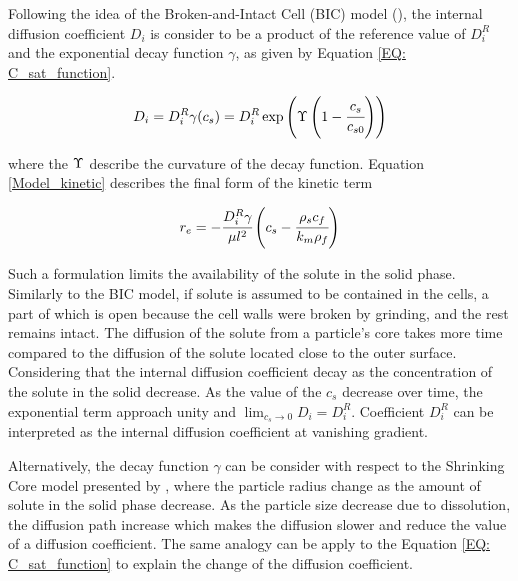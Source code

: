 \documentclass[../Article_Model_Parameters.tex]{subfiles}
\begin{document}
	Following the idea of the Broken-and-Intact Cell (BIC) model (\citet{Sovova2017}), the internal diffusion coefficient $D_i$ is consider to be a product of the reference value of $D_i^R$ and the exponential decay function $\gamma$, as given by Equation \ref{EQ: C_sat_function}.
		
	{\footnotesize
		\begin{equation}
			D_i = D_i^R \gamma(c_s) = D_i^R \exp \left( \Upsilon \left( 1-\cfrac{ c_s }{c_{s0}} \right) \right) \label{EQ: C_sat_function}
		\end{equation} }
	
	where the ${\color{black}\Upsilon}$ describe the curvature of the decay function. Equation \ref{Model_kinetic} describes the final form of the kinetic term
			
	{\footnotesize
		\begin{equation}
			\label{Model_kinetic}
				r_e = -\cfrac{D_i^R \gamma }{ \mu l^2 } \left( c_s  - \cfrac{\rho_s c_f }{ k_m \rho_f }  \right)
		\end{equation} }
	
	Such a formulation limits the availability of the solute in the solid phase. Similarly to the BIC model, if solute is assumed to be contained in the cells, a part of which is open because the cell walls were broken by grinding, and the rest remains intact. The diffusion of the solute from a particle's core takes more time compared to the diffusion of the solute located close to the outer surface. Considering that the internal diffusion coefficient decay as the concentration of the solute in the solid decrease. As the value of the $c_s$ decrease over time, the exponential term approach unity and $\lim_{ c_s \rightarrow 0} D_i =  D_i^R$. Coefficient $D_i^R$ can be interpreted as the internal diffusion coefficient at vanishing gradient. 
		
	Alternatively, the decay function $\gamma$ can be consider with respect to the Shrinking Core model presented by \citet{Goto1996}, where the particle radius change as the amount of solute in the solid phase decrease. As the particle size decrease due to dissolution, the diffusion path increase which makes the diffusion slower and reduce the value of a diffusion coefficient. The same analogy can be apply to the Equation \ref{EQ: C_sat_function} to explain the change of the diffusion coefficient.
		
\end{document}
